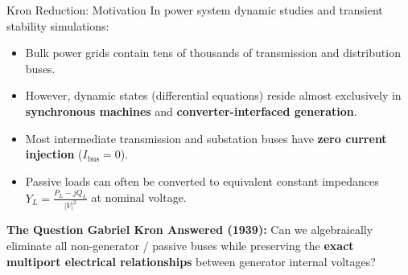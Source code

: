 \begin{frame}[allowframebreaks]{Kron Reduction: Motivation}
    In power system dynamic studies and transient stability simulations:
    \begin{itemize}
        \item Bulk power grids contain tens of thousands of transmission and distribution buses.
        \item However, dynamic states (differential equations) reside almost exclusively in \textbf{synchronous machines} and \textbf{converter-interfaced generation}.
        \item Most intermediate transmission and substation buses have \alert{\textbf{zero current injection}} ($I_{\text{bus}} = 0$).
        \item Passive loads can often be converted to equivalent constant impedances $Y_L = \frac{P_L - j Q_L}{|V|^2}$ at nominal voltage.
    \end{itemize}

    \textbf{The Question Gabriel Kron Answered (1939):}
    Can we algebraically eliminate all non-generator / passive buses while preserving the \alert{\textbf{exact multiport electrical relationships}} between generator internal voltages?
\end{frame}

